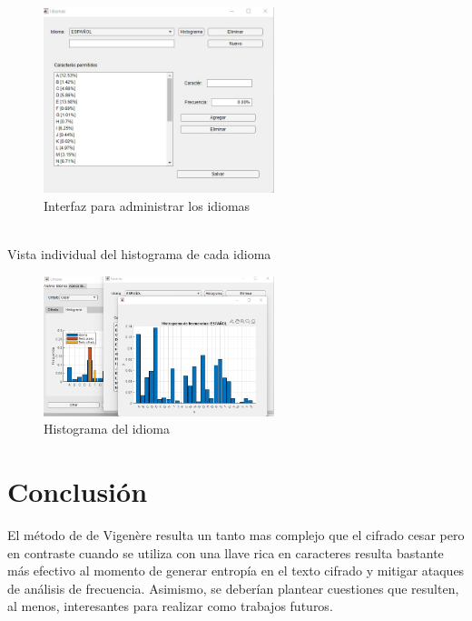 \documentclass[10pt]{article}
\begin{document}
\begin{figure}[!ht]
  \centering
  \includegraphics[width=0.6\textwidth]{GUI_3}
  \caption{Interfaz para administrar los idiomas}
  \label{fig_sim}
\end{figure}
\\
Vista individual del histograma de cada idioma
\begin{figure}[!ht]
  \centering
  \includegraphics[width=0.6\textwidth]{GUI_4}
  \caption{Histograma del idioma}
  \label{fig_sim}
\end{figure}


\par\vspace{\baselineskip}
\newpage

\section{Conclusión}
\justify
El método de de Vigenère resulta un tanto mas complejo que el cifrado cesar pero en contraste cuando se utiliza con una llave rica en caracteres resulta bastante más efectivo al momento de generar entropía en el texto cifrado y mitigar ataques de análisis de frecuencia.
Asimismo, se deberían plantear cuestiones que resulten, al menos, interesantes para
realizar como trabajos futuros.

 
 

\par\vspace{\baselineskip}
\end{document}
